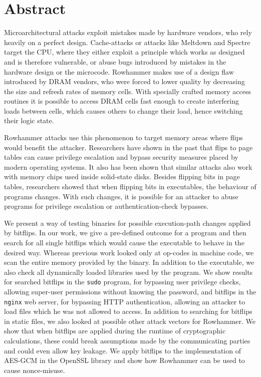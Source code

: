 
{}
\chapter*{Abstract}
\label{cha:abstract}

Microarchitectural attacks exploit mistakes made by hardware vendors, who rely
heavily on a perfect design. Cache-attacks or attacks like Meltdown and Spectre
target the CPU, where they either exploit a principle which works as designed
and is therefore vulnerable, or abuse bugs introduced by mistakes in the
hardware design or the microcode. Rowhammer makes use of a design flaw
introduced by DRAM vendors, who were forced to lower quality by decreasing the
size and refresh rates of memory cells. With specially crafted memory access
routines it is possible to access DRAM cells fast enough to create interfering
loads between cells, which causes others to change their load, hence switching
their logic state.

Rowhammer attacks use this phenomenon to target memory areas where flips would
benefit the attacker. Researchers have shown in the past that flips to
page tables can cause privilege escalation and bypass security measures placed
by modern operating systems. It also has been shown that similar attacks also
work with memory chips used inside solid-state disks. Besides flipping bits in
page tables, researchers showed that when flipping bits in executables, the
behaviour of programs changes. With such changes, it is possible for an attacker
to abuse programs for privilege escalation or authentication-check bypasses.

We present a way of testing binaries for possible execution-path changes applied
by bitflips. In our work, we give a pre-defined outcome for a program and then
search for all single bitflips which would cause the executable to behave in the
desired way. Whereas previous work looked only at op-codes in machine
code, we scan the entire memory provided by the binary. In addition to the
executable, we also check all dynamically loaded libraries used by the program.
We show results for searched bitflips in the \texttt{sudo} program, for
bypassing user privilege checks, allowing super-user permissions without knowing
the password, and bitflips in the \texttt{nginx} web server, for bypassing HTTP
authentication, allowing an attacker to load files which he was not allowed to
access. In addition to searching for bitflips in static files, we also looked at
possible other attack vectors for Rowhammer. We show that when bitflips are
applied during the runtime of cryptographic calculations, these could break
assumptions made by the communicating parties and could even allow key leakage.
We apply bitflips to the implementation of AES-GCM in the OpenSSL library and
show how Rowhammer can be used to cause nonce-misuse.

